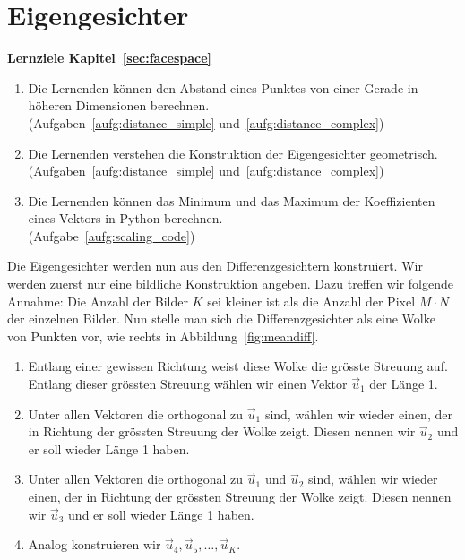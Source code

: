 \section{Eigengesichter} \label{sec:eigenfaces}
\begin{tcolorbox}
	\centerline{\textbf{Lernziele Kapitel~\ref{sec:facespace}}}
	\begin{enumerate}[leftmargin=*,label=\thesection.\arabic*]
		\item \label{item:distance} Die Lernenden können den Abstand eines Punktes von einer Gerade in höheren Dimensionen berechnen.\\
		(Aufgaben~\ref{aufg:distance_simple} und~\ref{aufg:distance_complex})
		\item \label{item:eigenfaces} Die Lernenden verstehen die Konstruktion der Eigengesichter geometrisch.\\
		(Aufgaben~\ref{aufg:distance_simple} und~\ref{aufg:distance_complex})
		\item \label{item:scaling} Die Lernenden können das Minimum und das Maximum der Koeffizienten eines Vektors in Python berechnen.\\
		(Aufgabe~\ref{aufg:scaling_code})
	\end{enumerate}
\end{tcolorbox}
Die Eigengesichter werden nun aus den Differenzgesichtern konstruiert.
Wir werden zuerst nur eine bildliche Konstruktion angeben.
Dazu treffen wir folgende Annahme: Die Anzahl der Bilder $K$ sei kleiner ist als die Anzahl der Pixel $M\cdot N$ der einzelnen Bilder.
Nun stelle man sich die Differenzgesichter als eine \glqq{}Wolke\grqq{} von Punkten vor, wie rechts in Abbildung~\ref{fig:meandiff}.
\begin{enumerate}[leftmargin=2cm, label=Schritt \arabic*]
	\item Entlang einer gewissen Richtung weist diese Wolke die grösste Streuung auf.
	Entlang dieser grössten Streuung wählen wir einen Vektor $\vec u_1$ der Länge 1.
	\item \label{item:u2} Unter allen Vektoren die orthogonal zu $\vec u_1$ sind, wählen wir wieder einen, der in Richtung der grössten Streuung der Wolke zeigt.
	Diesen nennen wir $\vec u_2$ und er soll wieder Länge 1 haben.
	\item Unter allen Vektoren die orthogonal zu $\vec u_1$ und $\vec u_2$ sind, wählen wir wieder einen, der in Richtung der grössten Streuung der Wolke zeigt.
	Diesen nennen wir $\vec u_3$ und er soll wieder Länge 1 haben.
	\item Analog konstruieren wir $\vec u_4,\vec u_5,\ldots,\vec u_K$.
\end{enumerate}
